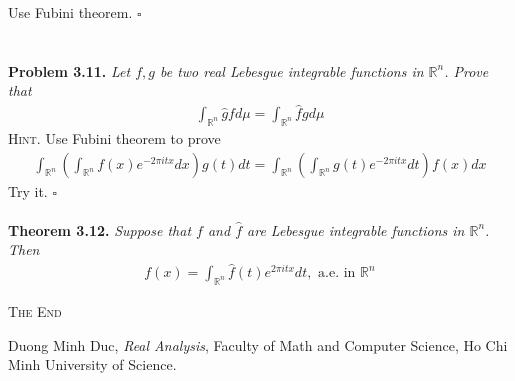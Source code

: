 \documentclass[a4paper]{article}
\numberwithin{equation}{section}
\begin{document}
Use Fubini theorem. \hfill $\square$\\
\\\\
\textbf{Problem 3.11.} \textit{Let $f,g $ be two real Lebesgue integrable functions in $\mathbb{R}^n$. Prove that}
\begin{align}
\int_{{\mathbb{R}^n}} {\widehat gfd\mu }  = \int_{{\mathbb{R}^n}} {\widehat fgd\mu } 
\end{align}
\textsc{Hint.} Use Fubini theorem to prove
\begin{align}
\int_{{\mathbb{R}^n}} {\left( {\int_{{\mathbb{R}^n}} {f\left( x \right){e^{ - 2\pi itx}}dx} } \right)g\left( t \right)dt}  = \int_{{\mathbb{R}^n}} {\left( {\int_{{\mathbb{R}^n}} {g\left( t \right){e^{ - 2\pi itx}}dt} } \right)f\left( x \right)dx} 
\end{align}
Try it. \hfill $\square$\\
\\
\textbf{Theorem 3.12.} \textit{Suppose that $f$ and $\widehat{f}$ are Lebesgue integrable functions in $\mathbb{R}^n$. Then}
\begin{align}
f\left( x \right) = \int_{{\mathbb{R}^n}} {\widehat f\left( t \right){e^{2\pi itx}}dt}, \mbox{ a.e. in }{\mathbb{R}^n}
\end{align}
\vspace{1.5cm}
\begin{center}
\textsc{The End}
\end{center}
\newpage
\printindex
\newpage
\begin{thebibliography}{999}
 Duong Minh Duc, \textit{Real Analysis}, Faculty of Math and Computer Science, Ho Chi Minh University of Science.
\end{thebibliography}
\end{document}
